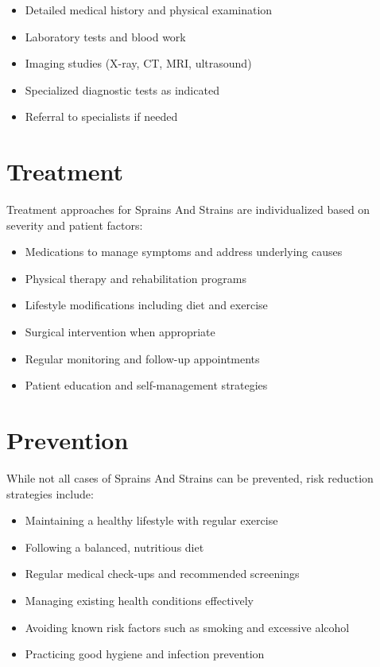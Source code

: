\begin{itemize}
\item Detailed medical history and physical examination
\item Laboratory tests and blood work
\item Imaging studies (X-ray, CT, MRI, ultrasound)
\item Specialized diagnostic tests as indicated
\item Referral to specialists if needed
\end{itemize}

\section*{Treatment}
Treatment approaches for Sprains And Strains are individualized based on severity and patient factors:

\begin{itemize}
\item Medications to manage symptoms and address underlying causes
\item Physical therapy and rehabilitation programs
\item Lifestyle modifications including diet and exercise
\item Surgical intervention when appropriate
\item Regular monitoring and follow-up appointments
\item Patient education and self-management strategies
\end{itemize}

\section*{Prevention}
While not all cases of Sprains And Strains can be prevented, risk reduction strategies include:

\begin{itemize}
\item Maintaining a healthy lifestyle with regular exercise
\item Following a balanced, nutritious diet
\item Regular medical check-ups and recommended screenings
\item Managing existing health conditions effectively
\item Avoiding known risk factors such as smoking and excessive alcohol
\item Practicing good hygiene and infection prevention
\end{itemize}


